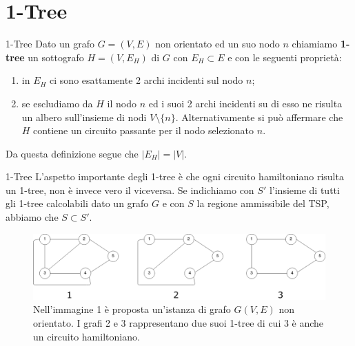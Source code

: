 \documentclass[10pt]{beamer}
\begin{document}
\section{1-Tree}
\begin{frame}{1-Tree}
    Dato un grafo $G=(V,E)$ non orientato ed un suo nodo $n$ chiamiamo \textbf{1-tree} un sottografo $H = (V, E_H)$ di $G$ con $E_H \subset E$ e con le seguenti proprietà:
    \begin{enumerate}
        \item in $E_H$ ci sono esattamente 2 archi incidenti sul nodo $n$;
        \item se escludiamo da $H$ il nodo $n$ ed i suoi 2 archi incidenti su di esso ne risulta un albero sull'insieme di nodi $V \setminus \{n\}$. Alternativamente si può affermare che $H$ contiene un circuito passante per il nodo selezionato $n$.
    \end{enumerate}
    Da questa definizione segue che $|E_H| = |V|$.
\end{frame}

\begin{frame}{1-Tree}
    L'aspetto importante degli 1-tree è che ogni circuito hamiltoniano risulta un 1-tree, non è invece vero il viceversa. Se indichiamo con $S'$ l'insieme di tutti gli 1-tree calcolabili dato un grafo $G$ e con $S$ la regione ammissibile del TSP, abbiamo che $S \subset S'$.
    
    \begin{figure}
        \centering
         \includegraphics[scale=0.21]{files/1TreeEsempi.png}
        \caption{Nell'immagine 1 è proposta un'istanza di grafo $G(V,E)$ non orientato. I grafi 2 e 3 rappresentano due suoi 1-tree di cui 3 è anche un circuito hamiltoniano.}
    \end{figure}
       
   
\end{frame}
\end{document}
